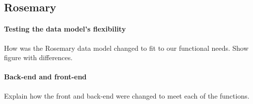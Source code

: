 \subsection{Rosemary}
\paragraph{Testing the data model's flexibility}
How was the Rosemary data model changed to fit to our functional needs.
Show figure with differences.
\paragraph{Back-end and front-end}
Explain how the front and back-end were changed to meet each of the functions.